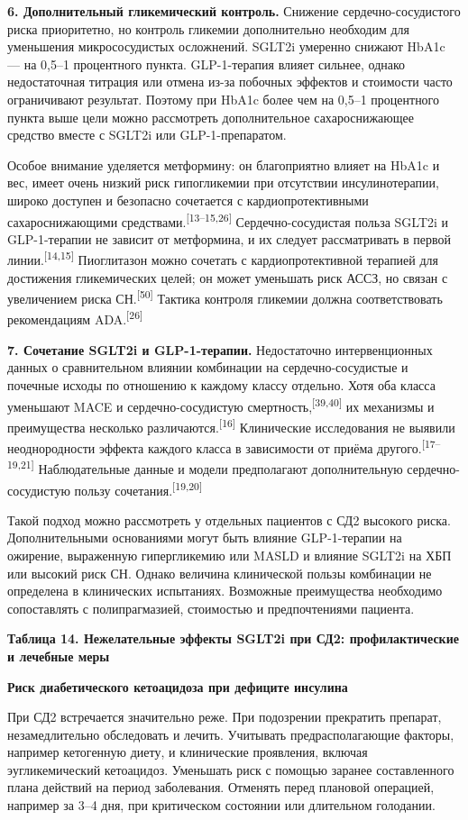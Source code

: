 \documentclass[11pt,a4paper]{article}
\newcommand{\src}[1]{\textsuperscript{[#1]}}
\newcommand{\heading}[1]{\par\medskip\textbf{#1}\par}
\begin{document}
\textbf{6. Дополнительный гликемический контроль.} Снижение сердечно-сосудистого риска приоритетно, но контроль гликемии дополнительно необходим для уменьшения микрососудистых осложнений. SGLT2i умеренно снижают HbA1c --- на 0,5--1 процентного пункта. GLP-1-терапия влияет сильнее, однако недостаточная титрация или отмена из-за побочных эффектов и стоимости часто ограничивают результат. Поэтому при HbA1c более чем на 0,5--1 процентного пункта выше цели можно рассмотреть дополнительное сахароснижающее средство вместе с SGLT2i или GLP-1-препаратом.

Особое внимание уделяется метформину: он благоприятно влияет на HbA1c и вес, имеет очень низкий риск гипогликемии при отсутствии инсулинотерапии, широко доступен и безопасно сочетается с кардиопротективными сахароснижающими средствами.\src{13--15,26} Сердечно-сосудистая польза SGLT2i и GLP-1-терапии не зависит от метформина, и их следует рассматривать в первой линии.\src{14,15} Пиоглитазон можно сочетать с кардиопротективной терапией для достижения гликемических целей; он может уменьшать риск АССЗ, но связан с увеличением риска СН.\src{50} Тактика контроля гликемии должна соответствовать рекомендациям ADA.\src{26}

\textbf{7. Сочетание SGLT2i и GLP-1-терапии.} Недостаточно интервенционных данных о сравнительном влиянии комбинации на сердечно-сосудистые и почечные исходы по отношению к каждому классу отдельно. Хотя оба класса уменьшают MACE и сердечно-сосудистую смертность,\src{39,40} их механизмы и преимущества несколько различаются.\src{16} Клинические исследования не выявили неоднородности эффекта каждого класса в зависимости от приёма другого.\src{17--19,21} Наблюдательные данные и модели предполагают дополнительную сердечно-сосудистую пользу сочетания.\src{19,20}

Такой подход можно рассмотреть у отдельных пациентов с СД2 высокого риска. Дополнительными основаниями могут быть влияние GLP-1-терапии на ожирение, выраженную гипергликемию или MASLD и влияние SGLT2i на ХБП или высокий риск СН. Однако величина клинической пользы комбинации не определена в клинических испытаниях. Возможные преимущества необходимо сопоставлять с полипрагмазией, стоимостью и предпочтениями пациента.

\heading{Таблица 14. Нежелательные эффекты SGLT2i при СД2: профилактические и лечебные меры}
\heading{Риск диабетического кетоацидоза при дефиците инсулина}
При СД2 встречается значительно реже. При подозрении прекратить препарат, незамедлительно обследовать и лечить. Учитывать предрасполагающие факторы, например кетогенную диету, и клинические проявления, включая эугликемический кетоацидоз. Уменьшать риск с помощью заранее составленного плана действий на период заболевания. Отменять перед плановой операцией, например за 3--4 дня, при критическом состоянии или длительном голодании.
\end{document}
